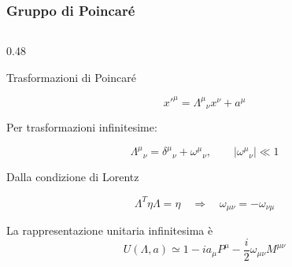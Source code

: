 \documentclass[11pt,t,aspectratio=169]{beamer}
\begin{document}
\begin{frame}[t]

    \frametitle{Gruppo di Poincaré}
    \vspace{-0.6cm}

    \begin{columns}[T,onlytextwidth]


        \begin{column}{0.48\textwidth}

            \begin{exampleblock}{Trasformazioni di Poincaré}

                \begin{minipage}[t][0.76\textheight][t]{\linewidth}

                    \[
                        x'^{\mu}
                        =
                        \Lambda^{\mu}{}_{\nu}x^{\nu}
                        +
                        a^{\mu}
                    \]

                    \vspace{-0.15cm}

                    Per trasformazioni infinitesime:

                    \[
                        \Lambda^{\mu}{}_{\nu}
                        =
                        \delta^{\mu}{}_{\nu}
                        +
                        \omega^{\mu}{}_{\nu},
                        \qquad
                        |\omega^{\mu}{}_{\nu}|\ll 1
                    \]

                    \vspace{-0.2cm}

                    Dalla condizione di Lorentz

                    \vspace{-0.2cm}

                    \[
                        \Lambda^T\eta\Lambda=\eta
                        \quad\Rightarrow\quad
                        \omega_{\mu\nu}
                        =
                        -\omega_{\nu\mu}
                    \]

                    \vspace{-0.25cm}

                    La rappresentazione unitaria infinitesima è
                    \vspace{-0.35cm}
                    \[
                        U(\Lambda,a)
                        \simeq
                        1
                        -
                        ia_\mu P^\mu
                        -
                        \frac{i}{2}
                        \omega_{\mu\nu}M^{\mu\nu}
                    \]


\end{minipage}
\end{exampleblock}
\end{column}
\end{columns}
\end{frame}
\end{document}
